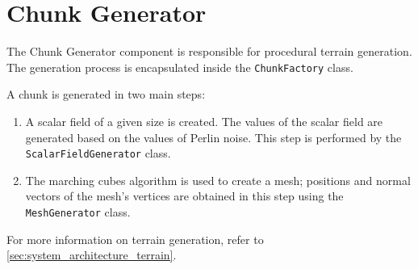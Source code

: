 \section{Chunk Generator} \label{chunk_generator}
The Chunk Generator component is responsible for procedural terrain generation.
The generation process is encapsulated inside the \texttt{ChunkFactory} class.

A chunk is generated in two main steps:
\begin{enumerate}
      \item A scalar field of a given size is created.
            The values of the scalar field are generated based on the values of Perlin noise.
            This step is performed by the \texttt{ScalarFieldGenerator} class.
      \item The marching cubes algorithm is used to create a mesh;
            positions and normal vectors of the mesh's vertices are obtained in this step using the \texttt{MeshGenerator} class.
\end{enumerate}
For more information on terrain generation, refer to \autoref{sec:system_architecture_terrain}.